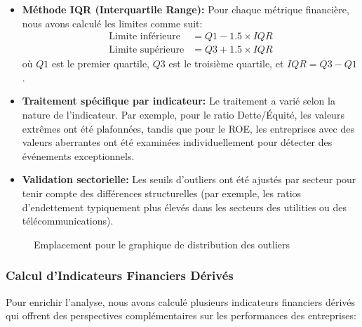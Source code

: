 \documentclass[12pt]{article}
\begin{document}
\begin{itemize}
    \item \textbf{Méthode IQR (Interquartile Range):} Pour chaque métrique financière, nous avons calculé les limites comme suit:
    \begin{align}
    \text{Limite inférieure} &= Q1 - 1.5 \times IQR\\
    \text{Limite supérieure} &= Q3 + 1.5 \times IQR
    \end{align}
    où $Q1$ est le premier quartile, $Q3$ est le troisième quartile, et $IQR = Q3 - Q1$.
    
    \item \textbf{Traitement spécifique par indicateur:} Le traitement a varié selon la nature de l'indicateur. Par exemple, pour le ratio Dette/Équité, les valeurs extrêmes ont été plafonnées, tandis que pour le ROE, les entreprises avec des valeurs aberrantes ont été examinées individuellement pour détecter des événements exceptionnels.
    
    \item \textbf{Validation sectorielle:} Les seuils d'outliers ont été ajustés par secteur pour tenir compte des différences structurelles (par exemple, les ratios d'endettement typiquement plus élevés dans les secteurs des utilities ou des télécommunications).
\end{itemize}

\begin{figure}[H]
    \centering
    \caption{Emplacement pour le graphique de distribution des outliers}
    \label{fig:outliers}
\end{figure}

\subsubsection{Calcul d'Indicateurs Financiers Dérivés}
Pour enrichir l'analyse, nous avons calculé plusieurs indicateurs financiers dérivés qui offrent des perspectives complémentaires sur les performances des entreprises:
\end{document}
